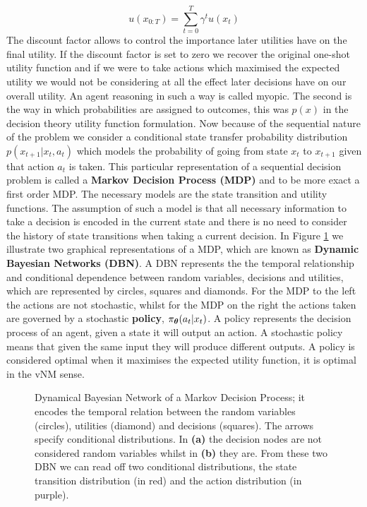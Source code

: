 \begin{equation}
    u(x_{0:T}) 	   = \sum\limits_{t=0}^{T} \gamma^{t} u(x_t) \label{eq:joint_state_actions_util}
\end{equation}
The discount factor allows to control the importance later utilities have on the final utility. If the discount factor is set to
zero we recover the original one-shot utility function and if we were to take actions which maximised the expected utility 
we would not be considering at all the effect later decisions have on our overall utility. An agent reasoning in such a way is 
called myopic.
The second is the way in which probabilities are assigned to outcomes, this was $p(x)$ in the decision theory utility function formulation.
Now because of the sequential nature of the problem we consider a conditional state transfer probability distribution $p(x_{t+1}|x_t,a_t)$
which models the probability of going from state $x_t$ to $x_{t+1}$ given that action $a_t$ is taken. This particular representation of a
sequential decision problem is called a \textbf{Markov Decision Process (MDP)} and to be more exact a first order MDP.
The necessary models are the state transition and utility functions. The assumption of such a model is that all necessary information to 
take a decision is encoded in the current state and there is no need to consider the history of state transitions when taking a current decision.
In Figure \ref{fig:mdp} we illustrate two graphical representations of a MDP, which are known as \textbf{Dynamic Bayesian Networks (DBN)}.
A DBN represents the the temporal relationship and conditional dependence between random variables, decisions and utilities, which are 
represented by circles, squares and diamonds. For the MDP to the left the actions are not stochastic, whilst for the MDP on the right 
the actions taken are governed by a stochastic \textbf{policy}, $\operatorname{\pi_{\boldsymbol{\theta}}}(a_t|x_t)$. A policy represents the decision process of an agent,
given a state it will output an action. A stochastic policy means that given the same input they will produce
different outputs. A policy is considered optimal when it maximises the expected utility function, it is optimal in the vNM sense.

\begin{figure}[h]
  \centering
  \caption{Dynamical Bayesian Network of a Markov Decision Process; it encodes the temporal relation between the random variables (circles),
  utilities (diamond) and decisions (squares). The arrows specify conditional distributions. In \textbf{(a)} the decision nodes are not considered 
  random variables whilst in \textbf{(b)} they are. From these two DBN  we can read off two conditional distributions, the state transition distribution (in red) and the action distribution (in purple). }
    \label{fig:mdp}
\end{figure}

